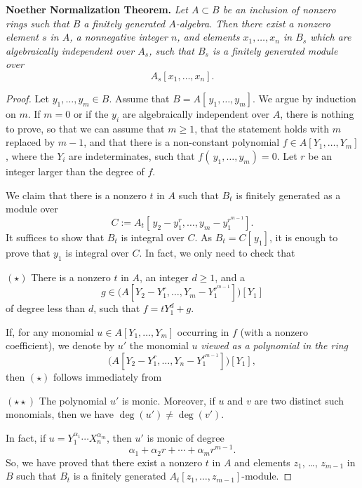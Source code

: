 \documentclass[parskip=half]{scrartcl}%
\begin{document}
\textbf{Noether Normalization Theorem.} \emph{Let $A\subset B$ be an inclusion of nonzero rings such that $B$ a finitely generated $A$-algebra. Then there exist a nonzero element $s$ in $A$, a nonnegative integer $n$, and elements $x_1,\dots,x_n$ in $B_s$ which are algebraically independent over $A_s$, such that $B_s$ is a finitely generated module over} 
$$
A_s[x_1,\dots,x_n].
$$ 
\begin{proof} 
Let $y_1,\dots,y_m\in B$. Assume that $B=A[\,y_1,\dots,y_m]$. We argue by induction on $m$. If $m=0$ or if the $y_i$ are algebraically independent over $A$, there is nothing to prove, so that we can assume that $m\ge1$, that the statement holds with $m$ replaced by $m-1$, and that there is a non-constant polynomial $f\in A[Y_1,\dots,Y_m]$, where the $Y_i$ are indeterminates, such that $f(\,y_1,\dots,y_m)=0$. Let $r$ be an integer larger than the degree of $f$. 

We claim that there is a nonzero $t$ in $A$ such that $B_t$ is finitely generated as a module over 
$$
C:=A_t\left[\,y_2-y_1^r,\dots,y_m-y_1^{r^{m-1}}\right].
$$ 
It suffices to show that $B_t$ is integral over $C$. As $B_t=C[\,y_1]$, it is enough to prove that $y_1$ is integral over $C$. In fact, we only need to check that 

$(\star)$ There is a nonzero $t$ in $A$, an integer $d\ge1$, and a 
$$
g\in\bigg(A\left[Y_2-Y_1^r,\dots,Y_m-Y_1^{r^{m-1}}\right]\bigg)[Y_1]
$$ 
of degree less than $d$, such that $f=tY_1^d+g$. 

If, for any monomial $u\in A[Y_1,\dots,Y_m]$ occurring in $f$ (with a nonzero coefficient), we denote by $u'$ the monomial $u$ \emph{viewed as a polynomial in the ring} 
$$
\bigg(A\left[Y_2-Y_1^r,\dots,Y_n-Y_1^{r^{m-1}}\right]\bigg)[Y_1],
$$ 
then $(\star)$ follows immediately from 

$(\star\star)$ The polynomial $u'$ is monic. Moreover, if $u$ and $v$ are two distinct such monomials, then we have $\deg(u')\ne\deg(v')$.

In fact, if $u=Y_1^{\alpha_1}\cdots X_n^{\alpha_m}$, then $u'$ is monic of degree 
$$
\alpha_1+\alpha_2r+\cdots+\alpha_mr^{m-1}.
$$ 
So, we have proved that there exist a nonzero $t$ in $A$ and elements $z_1$, \dots, $z_{m-1}$ in $B$ such that $B_t$ is a finitely generated $A_t[z_1,\dots,z_{m-1}]$-module. 


\end{proof}
\end{document}
